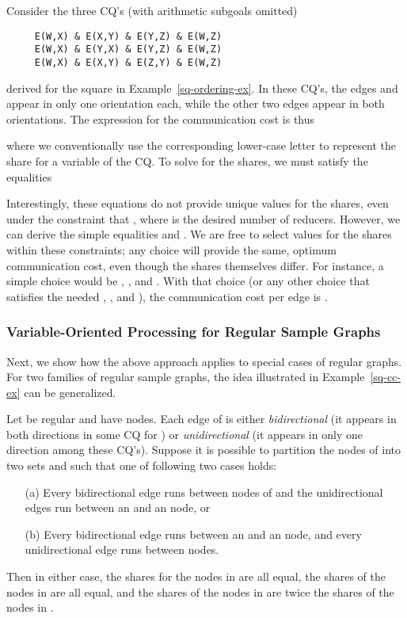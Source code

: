 \begin{example}
\label{sq-cc-ex}
Consider the three CQ's (with arithmetic subgoals omitted)

\begin{verbatim}
     E(W,X) & E(X,Y) & E(Y,Z) & E(W,Z)
     E(W,X) & E(Y,X) & E(Y,Z) & E(W,Z)
     E(W,X) & E(X,Y) & E(Z,Y) & E(W,Z)
\end{verbatim}
derived for the square in Example~\ref{sq-ordering-ex}.
In these CQ's, the edges  and  appear in only one orientation each, while the other two edges appear in both orientations.  The expression for the communication cost is thus

where we conventionally use the corresponding lower-case letter to represent the share for a variable of the CQ.
To solve for the shares, we must satisfy the equalities

Interestingly, these equations do not provide unique values for the shares, even under the constraint that , where  is the desired number of reducers.  However, we can derive the simple equalities  and .  We are free to select values for the shares within these constraints; any choice will provide the same, optimum communication cost, even though the shares themselves differ.  For instance, a simple choice would be , , and .  With that choice (or any other choice that satisfies the needed , , and ), the communication cost per edge is .
\end{example}


\subsubsection{Variable-Oriented Processing for Regular Sample Graphs}
\label{combine-app-regular}

Next, we show how the above approach applies to special cases of
regular graphs. For two families of regular sample graphs, the idea illustrated in Example~\ref{sq-cc-ex} can be generalized.

\begin{theorem}\label{shares2-th}
Let  be regular and have  nodes.  Each edge of  is either {\em bidirectional} (it appears in both directions in some CQ for ) or {\em unidirectional} (it appears in only one direction among these CQ's).
Suppose it is possible to partition the nodes of  into two sets  and  such that one of following two cases holds:

\begin{itemize}
\item[(a)]
Every bidirectional edge runs between nodes of  and the
unidirectional edges run between an  and an  node, or

\item[(b)]
Every bidirectional edge runs between an  and an  node, and
every unidirectional edge runs between  nodes.
\end{itemize}

Then in either case, the shares for the nodes in  are all equal, the shares of the nodes in  are all equal, and the shares of the nodes in  are twice the shares of the nodes in .
\end{theorem}

